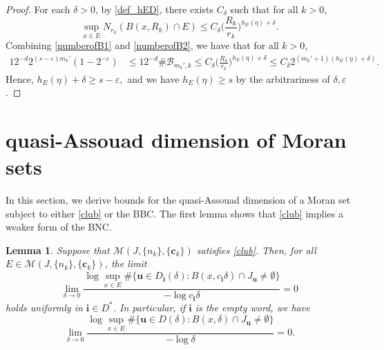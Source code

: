 \documentclass[12pt]{amsart}
\numberwithin{equation}{section}
\theoremstyle{plain}
\newtheorem{lemma}[theorem]{Lemma}
\theoremstyle{remark}
\theoremstyle{definition}
\newcommand{\iii}{\mathbf{i}}
\newcommand{\bu}{\mathbf{u}}
\newcommand{\ccc}{\mathbf{c}}
\newcommand{\eps}{\varepsilon}
\newcommand{\de}{\delta}
\renewcommand{\ge}{\geqslant}
\renewcommand{\le}{\leqslant}
\begin{document}
\begin{proof}
		For each  $\de>0$, by \eqref{def_hED}, there exists $C_{\de}$ such that for all $k>0$,
		\[
		\sup_{x\in E}N_{r_k}\left(B(x,R_k)\cap E\right)\le C_{\de}\Big(\frac{R_k}{r_k}\Big)^{h_E(\eta)+\de}. 
		\]
		Combining \eqref{numberofB1} and \eqref{numberofB2}, we have that for all $k>0$, 
		\begin{align*}
			12^{-d}2^{(s-\eps) m_k'}(1-2^{-\eps})&\le 12^{-d}\#\mathcal{B}_{m_k',k} 
			\le C_{\de}\Big(\frac{R_k}{r_k}\Big)^{h_{E}(\eta)+\de} \le C_{\de}2^{(m_k'+1)(h_{E}(\eta)+\de)}.
		\end{align*}
Hence,  $	h_{E}(\eta)+\de\ge s-\eps, $ and we have $h_E(\eta)\ge s$ by the arbitrariness of  $\de, \eps$. 
	\end{proof}
	
	\section{quasi-Assouad dimension of Moran sets }\label{sec_qadms}
	
In this section, we derive bounds for the quasi-Assouad dimension of a Moran set subject to either \eqref{club} or the BBC. 
	 The first lemma shows that \eqref{club} implies a weaker form of the BNC.  
	\begin{lemma}\label{numberofcap}
Suppose  that $\mathcal{M}(J,\{n_k\},\{\ccc_k\})$ satisfies \eqref{club}.  Then, for all $E\in\mathcal{M}(J,\{n_k\},\{\ccc_k\})$,  the limit
		\[
		\lim_{\de\to 0}\frac{\log \sup_{x\in E}\#\{\bu\in D_{\iii}(\de):B(x,c_{\iii}\de)\cap J_{\bu}\neq \emptyset\}}{-\log c_{\iii}\de}=0
		\]
		holds uniformly in  $\iii\in D^*$. In particular, if $\iii$ is the empty word, we have 
	\begin{equation}\label{AWSC}
		\lim_{\de\to 0}\frac{\log \sup_{x\in E}\#\{\bu\in D(\de):B(x,\de)\cap J_{\bu}\neq \emptyset\}}{-\log\de}=0.
		\end{equation}
	\end{lemma}
	
\end{document}
